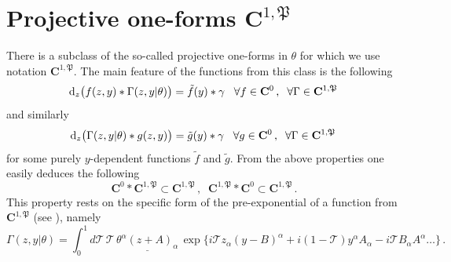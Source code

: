 \documentclass[12pt]{article}
\newcommand{\dr}{{{\rm d}}}
\begin{document}
\section{Projective one-forms $\mathbf{C}^{1,\mathfrak{P}}$}\label{projective_forms}
There is a subclass of the so-called projective one-forms in $\theta$ for which we use notation $\mathbf{C}^{1,\mathfrak{P}}$. The main feature of the functions from this class is the following
\begin{equation}
\dr_z\big(f(z,y)\ast \Gamma(z,y|\theta)\big)=\tilde{f}(y)\ast \gamma\;\;\; \forall f\in\mathbf{C}^0\,, \;\; \forall \Gamma\in \mathbf{C}^{1,\mathfrak{P}}\,
\end{equation}
and similarly
\begin{equation}
\dr_z\big(\Gamma(z,y|\theta)\ast g(z,y)\big)=\tilde{g}(y)\ast \gamma\;\;\; \forall g\in\mathbf{C}^0\,, \;\; \forall \Gamma\in \mathbf{C}^{1,\mathfrak{P}}\,
\end{equation}
for some purely $y$-dependent functions $\tilde{f}$ and $\tilde{g}$. From the above properties one easily deduces the following
\begin{equation}
\mathbf{C}^0\ast \mathbf{C}^{1,\mathfrak{P}}\subset \mathbf{C}^{1,\mathfrak{P}}\,,\;\; \mathbf{C}^{1, \mathfrak{P}} \ast \mathbf{C}^0\subset \mathbf{C}^{1, \mathfrak{P}}\,.
\end{equation}
This property rests on the specific form of the pre-exponential of a function from $\mathbf{C}^{1,\mathfrak{P}}$ (see \cite{Didenko:2026nag}), namely
\begin{equation}
\Gamma(z,y|\theta)=\int_0^1 d\mathcal{T}\, \mathcal{T}\, \underline{\theta^\alpha (z+A)_\alpha}\, \exp\big\{i\mathcal{T}z_\alpha(y-B)^\alpha+i(1-\mathcal{T})y^\alpha A_\alpha-i\mathcal{T} B_\alpha A^\alpha\dots\big\}\,.
\end{equation}
\end{document}
